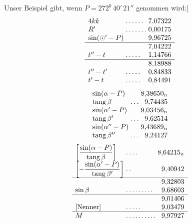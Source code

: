Unser Beispiel gibt, wenn \(P=272^{0}\,40'\,21''\) genommen wird:]
\[
\begin{array}{l@{\;}l@{\;}r}
4kk&\mathord{.}\,\mathord{.}\,\mathord{.}\,\mathord{.}\,\mathord{.}\,\mathord{.}&7{,}07322\\
R'&\mathord{.}\,\mathord{.}\,\mathord{.}\,\mathord{.}\,\mathord{.}\,\mathord{.}\,\mathord{.}&0{,}00175\\
\sin(\odot'-P)&&9{,}96725\\\hline
&&7{,}04222\\
t''-t&\mathord{.}\,\mathord{.}\,\mathord{.}\,\mathord{.}\,\mathord{.}&1{,}14766\\\hline
&&8{,}18988\\
t''-t'&\mathord{.}\,\mathord{.}\,\mathord{.}\,\mathord{.}\,\mathord{.}&0{,}84833\\
t'-t&\mathord{.}\,\mathord{.}\,\mathord{.}\,\mathord{.}\,\mathord{.}&0{,}84491
\end{array}
\]
\[
\begin{array}{l@{\;}l@{\;}r}
\sin(\alpha-P)&&8{,}38650_n\\
\operatorname{tang}\beta&\mathord{.}\,\mathord{.}\,\mathord{.}&9{,}74435\\
\sin(\alpha'-P)&&9{,}03456_n\\
\operatorname{tang}\beta'&\mathord{.}\,\mathord{.}\,\mathord{.}&9{,}62514\\
\sin(\alpha''-P)&&9{,}43689_n\\
\operatorname{tang}\beta''&\mathord{.}\,\mathord{.}\,\mathord{.}&9{,}24127
\end{array}
\]
\[
\begin{array}{l@{\;}l@{\;}r}
\left[\dfrac{\sin(\alpha-P)}{\operatorname{tang}\beta}\right]&\mathord{.}\,\mathord{.}\,\mathord{.}\,\mathord{.}&8{,}64215_n\\[3pt]
\left[-\dfrac{\sin(\alpha'-P)}{\operatorname{tang}\beta'}\right]&\mathord{.}\,\mathord{.}&9{,}40942\\[3pt]\hline
&&9{,}32803\\
\sin\beta&\mathord{.}\,\mathord{.}\,\mathord{.}\,\mathord{.}\,\mathord{.}\,\mathord{.}\,\mathord{.}\,\mathord{.}\,\mathord{.}&9{,}68603\\\hline
&&9{,}01406\\
{}[\text{Nenner}]&\mathord{.}\,\mathord{.}\,\mathord{.}\,\mathord{.}\,\mathord{.}&9{,}03479\\\hline
M&\mathord{.}\,\mathord{.}\,\mathord{.}\,\mathord{.}\,\mathord{.}\,\mathord{.}\,\mathord{.}\,\mathord{.}\,\mathord{.}\,\mathord{.}&9{,}97927
\end{array}
\]
